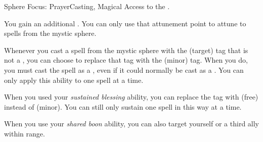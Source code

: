   \begin{magicalfeat}{Sphere Focus: Prayer}{Casting, Magical}
    \featpre Access to the  .

     You gain an additional .
    You can only use that attunement point to attune to spells from the  mystic sphere.

     Whenever you cast a spell from the  mystic sphere with the  (target) tag that is not a , you can choose to replace that tag with the  (minor) tag.
    When you do, you must cast the spell as a , even if it could normally be cast as a .
    You can only apply this ability to one spell at a time.

     When you used your \textit{sustained blessing} ability, you can replace the tag with  (free) instead of  (minor).
    You can still only sustain one spell in this way at a time.

     When you use your \textit{shared boon} ability, you can also target yourself or a third ally within range.
  \end{magicalfeat}


